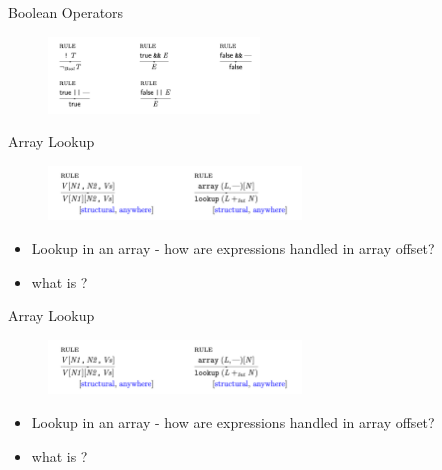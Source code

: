 \documentclass{beamer}
\begin{document}
\begin{frame}{Boolean Operators}
    \begin{figure}
        \centering
    \includegraphics[width=0.5\textwidth]{bool-1}
    \end{figure}
\end{frame}
\begin{frame}{Array Lookup}
    \begin{figure}
        \centering
    \includegraphics[width=0.6\textwidth]{array-lookup}
    \end{figure}

    \pause
    \begin{itemize}
        \item Lookup in an array - how are
            expressions handled in array offset?
        \pause
        \item what is ?
        \pause
    \end{itemize}
\end{frame}

\begin{frame}{Array Lookup}
    \begin{figure}
        \centering
    \includegraphics[width=0.6\textwidth]{array-lookup}
    \end{figure}

    \pause
    \begin{itemize}
        \item Lookup in an array - how are
            expressions handled in array offset?
        \pause
        \item what is ?
        \pause
    \end{itemize}
\end{frame}
\end{document}

